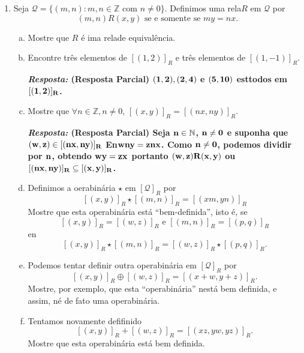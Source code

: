 \begin{enumerate}[{\bf 1.}]
\noindent \textit{\textbf{``contra-exemplo'':}} Sejam $A=\{1,2\}$, $B=\{1,2,3\}$ e $f:A\to B$ dada por $f(1)=1$ e $f(2)=1$. Ent\ao
\[
f^{-1}\bola f=\{(\varnothing,\varnothing),(\{1\},\{1,2\}), (\{1,2\},\{1,2\}), (\{2\},\{1,2\})\},
\]
que \'e sim\'etrica mas n\ao reflexiva.

\item Seja $\mathcal{Q}=\{(m,n): m,n\in \mathbb{Z} \textrm{ com } n\neq 0\}$. Definimos uma rela\cao $R$ em $\mathcal{Q}$ por
\[
(m,n)R(x,y) \textrm { se e somente se } my=nx.
\]
\begin{enumerate}[a)]
\item Mostre que $R$ \'e ima rela\cao de equival\^encia.
\item Encontre tr\^es elementos de $[(1,2)]_R$ e tr\^es elementos de $[(1,-1)]_R$.

{\bf{\it Resposta:} (Resposta Parcial) ${\bf (1,2),(2,4)}$ e ${\bf (5,10)}$ est\ao todos em ${\bf [(1,2)]_R}$.}

\item Mostre que $\forall n\in\mathbb{Z}, n\neq 0$, $[(x,y)]_R=[(nx,ny)]_R$.

{\bf{\it Resposta:} (Resposta Parcial) Seja ${\bf n\in\mathbb{N}}$, ${\bf n\neq 0}$ e suponha que ${\bf (w,z)\in[(nx,ny)]_R}$ En\tao ${\bf wny=znx}$. Como ${\bf n\neq 0}$, podemos dividir por ${\bf n}$, obtendo ${\bf wy=zx}$ portanto ${\bf (w,z)R(x,y)}$ ou ${\bf [(nx,ny)]_R\subseteq[(x,y)]_R}$.}

\item Definimos a oera\cao bin\'aria $\star$ em $[\mathcal{Q}]_R$ por
\[
[(x,y)]_R\star [(m,n)]_R=[(xm,yn)]_R
\]
Mostre que esta opera\cao bin\'aria est\'a ``bem-definida'', isto \'e, se
\[
[(x,y)]_R=[(w,z)]_R \textrm{ e } [(m,n)]_R=[(p,q)]_R
\]
en\tao
\[
[(x,y)]_R\star[(m,n)]_R=[(w,z)]_R\star[(p,q)]_R.
\]
\item Podemos tentar definir outra opera\cao bin\'aria em $[\mathcal{Q}]_R$ por
\[
[(x,y)]_R\oplus[(w,z)]_R=[(x+w,y+z)]_R.
\]
Mostre, por exemplo, que esta ``opera\cao bin\'aria'' n\ao est\'a bem definida, e assim, n\ao \'e de fato uma opera\cao bin\'aria.
\item  Tentamos novamente defifinido
\[
[(x,y)]_R+[(w,z)]_R=[(xz,yw,yz)]_R.
\]
Mostre que esta opera\cao bin\'aria est\'a bem definida.
\end{enumerate}

\indent [Nota: O leitor alerta pode ter feito a identifica\cao de $\mathcal{Q}$ com $\mathbb{Q}$, o conjunto dos n\'umeros racionais, com $m,n$ fazendo o papel de $m/n$. De fato, o que pensamos ser o n\'umero $1/2$ \'e realmente uma classe de esquival\^encia e igauldade de n\'umeros racionais \'e igualdade de classe de equival\^encia. Por isso no ensino b\'asico aprendemos que $1/2=3/6$.]


\end{enumerate}
